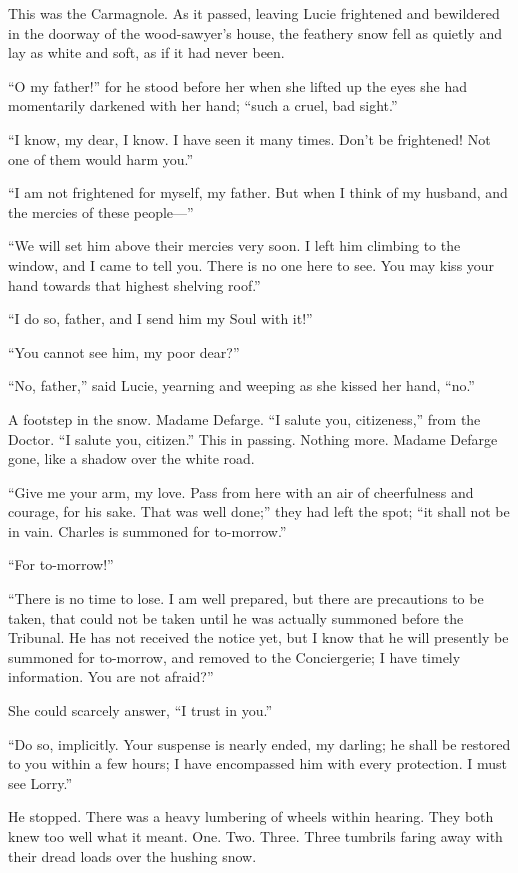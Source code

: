 This was the Carmagnole.  As it passed, leaving Lucie frightened and
bewildered in the doorway of the wood-sawyer's house, the feathery
snow fell as quietly and lay as white and soft, as if it had never been.

``O my father!'' for he stood before her when she lifted up the eyes
she had momentarily darkened with her hand; ``such a cruel, bad sight.''

``I know, my dear, I know.  I have seen it many times.  Don't be
frightened!  Not one of them would harm you.''

``I am not frightened for myself, my father.  But when I think of my
husband, and the mercies of these people---''

``We will set him above their mercies very soon.  I left him climbing
to the window, and I came to tell you.  There is no one here to see.
You may kiss your hand towards that highest shelving roof.''

``I do so, father, and I send him my Soul with it!''

``You cannot see him, my poor dear?''

``No, father,'' said Lucie, yearning and weeping as she kissed her hand,
``no.''

A footstep in the snow.  Madame Defarge.  ``I salute you, citizeness,''
from the Doctor.  ``I salute you, citizen.''  This in passing.  Nothing
more. Madame Defarge gone, like a shadow over the white road.

``Give me your arm, my love.  Pass from here with an air of cheerfulness
and courage, for his sake.  That was well done;'' they had left the spot;
``it shall not be in vain.  Charles is summoned for to-morrow.''

``For to-morrow!''

``There is no time to lose.  I am well prepared, but there are
precautions to be taken, that could not be taken until he was actually
summoned before the Tribunal.  He has not received the notice yet,
but I know that he will presently be summoned for to-morrow, and
removed to the Conciergerie; I have timely information.
You are not afraid?''

She could scarcely answer, ``I trust in you.''

``Do so, implicitly.  Your suspense is nearly ended, my darling; he
shall be restored to you within a few hours; I have encompassed him
with every protection.  I must see Lorry.''

He stopped.  There was a heavy lumbering of wheels within hearing.
They both knew too well what it meant.  One.  Two.  Three.  Three
tumbrils faring away with their dread loads over the hushing snow.

